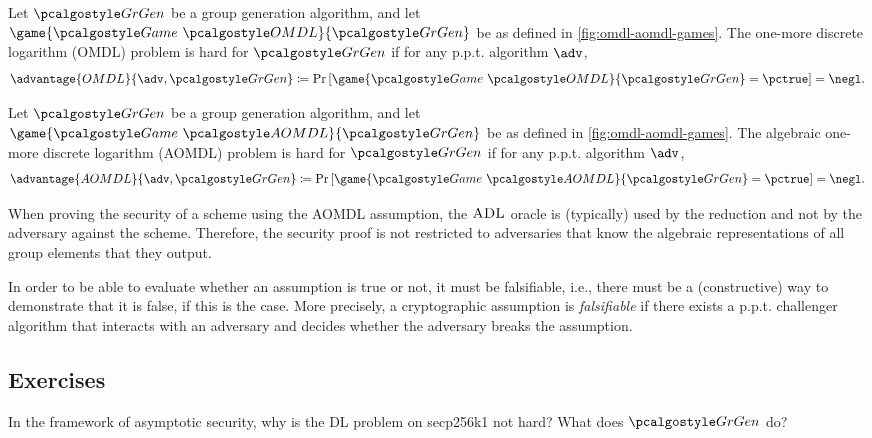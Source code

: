 \begin{definition}
  Let $\grgen$ be a group generation algorithm, and let $\game{\Game~\algo{OMDL}}{\grgen}$ be as defined in \autoref{fig:omdl-aomdl-games}.
  The one-more discrete logarithm (OMDL) problem is hard for $\grgen$ if for any p.p.t. algorithm $\adv$,
  \[
  \advantage{OMDL}{\adv, \grgen} \defeq \pr{\game{\Game~\algo{OMDL}}{\grgen} = \pctrue} = \negl.
  \]
\end{definition}

\begin{definition}
  Let $\grgen$ be a group generation algorithm, and let $\game{\Game~\algo{AOMDL}}{\grgen}$ be as defined in \autoref{fig:omdl-aomdl-games}.
  The algebraic one-more discrete logarithm (AOMDL) problem is hard for $\grgen$ if for any p.p.t. algorithm $\adv$,
  \[
  \advantage{AOMDL}{\adv, \grgen} \defeq \pr{\game{\Game~\algo{AOMDL}}{\grgen} = \pctrue} = \negl.
  \]
\end{definition}

\begin{remark}
  When proving the security of a scheme using the AOMDL assumption, the ${\normalfont\textsc{ADL}}$ oracle is (typically) used by the reduction and not by the adversary against the scheme.
  Therefore, the security proof is not restricted to adversaries that know the algebraic representations of all group elements that they output.
\end{remark}

\begin{remark}
  In order to be able to evaluate whether an assumption is true or not, it must be falsifiable, i.e., there must be a (constructive) way to demonstrate that it is false, if this is the case.
  More precisely, a cryptographic assumption is \emph{falsifiable} if there exists a p.p.t. challenger algorithm that interacts with an adversary and decides whether the adversary breaks the assumption.
\end{remark}

\subsection{Exercises}

\begin{exercise}
  In the framework of asymptotic security, why is the DL problem on secp256k1 not hard? What does $\grgen$ do?
\end{exercise}

